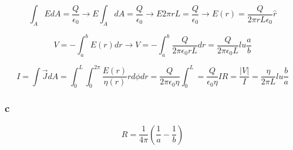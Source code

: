 \[
	\int_A E dA = \frac{Q}{\epsilon_0}
	\to E \int_A dA = \frac{Q}{\epsilon_0}
	\to E 2 \pi r L = \frac{Q}{\epsilon_0}
	\to E(r) = \frac{Q}{2 \pi r L \epsilon_0} \hat{r}
\]

\[
	V = - \int_a^b E(r) dr
	\to V = - \int_a^b \frac{Q}{2 \pi \epsilon_0 r L} dr
	= \frac{Q}{2 \pi \epsilon_0 L} lu \frac{a}{b}
\]

\[
	I = \int \vec{J} dA
	= \int_0^L \int_0^{2 \pi} \frac{E(r)}{\eta(r)} r d\phi dr
	= \frac{Q}{2 \pi \epsilon_0 \eta} \int_0^L
	= \frac{Q}{\epsilon_0 \eta} I R = \frac{|V|}{I}
	= \frac{\eta}{2 \pi L} lu \frac{b}{a}
\]

\subsubsection{c}

\[
	R = \frac{1}{4 \pi} (\frac{1}{a} - \frac{1}{b})
\]
